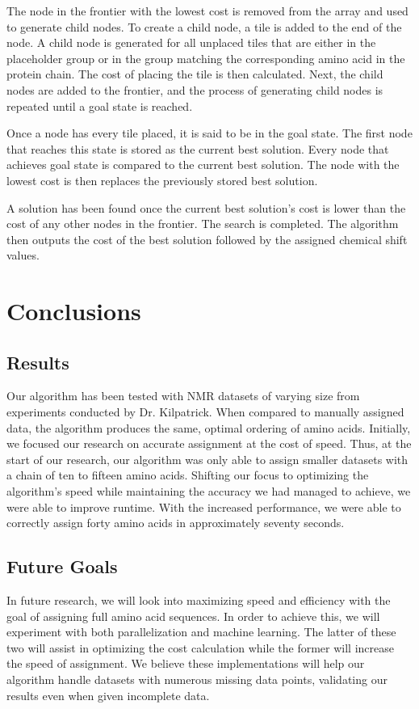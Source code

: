 \documentclass[12pt, letter]{article}
\begin{document}
The node in the frontier with the lowest cost is removed from the array and used to generate child nodes. To create a child node, a tile is added to the end of the node. A child node is generated for all unplaced tiles that are either in the placeholder group or in the group matching the corresponding amino acid in the protein chain. The cost of placing the tile is then calculated.  Next, the child nodes are added to the frontier, and the process of generating child nodes is repeated until a goal state is reached. 

Once a node has every tile placed, it is said to be in the goal state. The first node that reaches this state is stored as the current best solution. Every node that achieves goal state is compared to the current best solution. The node with the lowest cost is then replaces the previously stored best solution. 

A solution has been found once the current best solution's cost is lower than the cost of any other nodes in the frontier. The search is completed. The algorithm then outputs the cost of the best solution followed by the assigned chemical shift values. 

\section{Conclusions}
\label{sec:conclusions}

\subsection{Results}
\label{sub:results}
Our algorithm has been tested with NMR datasets of varying size from experiments conducted by Dr. Kilpatrick.  When compared to manually assigned data, the algorithm produces the same, optimal ordering of amino acids. Initially, we focused our research on accurate assignment at the cost of speed. Thus, at the start of our research, our algorithm was only able to assign smaller datasets with a chain of ten to fifteen amino acids. Shifting our focus to optimizing the algorithm's speed while maintaining the accuracy we had managed to achieve, we were able to improve runtime. With the increased performance, we were able to correctly assign forty amino acids in approximately seventy seconds.

\subsection{Future Goals} %
\label{sub:future_goals}
In future research, we will look into maximizing speed and efficiency with the goal of assigning  full amino acid sequences. In order to achieve this, we will experiment with both parallelization  and machine learning. The latter of these two will assist in optimizing the cost calculation while the former will increase the speed of assignment. We believe these implementations will help our algorithm handle datasets with numerous missing data points, validating our results even when given incomplete data.
\nocite{*}


\end{document}

